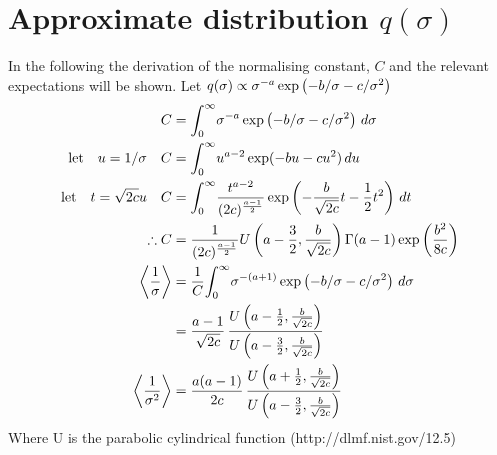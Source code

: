 \documentclass{article}
\begin{document}
\appendix
\section{Approximate distribution $q(\sigma)$}
In the following the derivation of the normalising constant, $C$ and the relevant expectations will be shown. Let $q(\sigma)\propto\sigma^{-a}\exp\left(-b/\sigma-c/\sigma^2\right)$
\begin{align}
\nonumber C&={\int_0^\infty}\sigma^{-a}\exp\left(-b/\sigma-c/\sigma^2\right)\,d\sigma\\
\nonumber \text{let}\quad u=1/\sigma\quad C &={\int_0^\infty} u^{a-2}\exp(-bu-cu^2)\,du \\
\nonumber \text{let}\quad t=\sqrt{2c}u \quad C & ={\int_0^\infty}\frac{t^{a-2}}{(2c)^{\frac{a-1}{2}}}\exp\left(-\frac{b}{\sqrt{2c}}t-\frac{1}{2}t^2\right)\,dt\\
\therefore C &=\frac{1}{(2c)^{\frac{a-1}{2}}}U\left(a-\frac{3}{2},\frac{b}{\sqrt{2c}}\right)\Gamma(a-1)\exp\left(\frac{b^2}{8c}\right)\\
\nonumber \left\langle\frac{1}{\sigma}\right\rangle&=\frac{1}{C}{\int_0^\infty}\sigma^{-(a+1)}\exp\left(-b/\sigma-c/\sigma^2\right)\,d\sigma\\
&=\frac{a-1}{\sqrt{2c}}\,\frac{U\left(a-\frac{1}{2},\frac{b}{\sqrt{2c}}\right)}{U\left(a-\frac{3}{2},\frac{b}{\sqrt{2c}}\right)}\\
\left\langle\frac{1}{\sigma^2}\right\rangle&=\frac{a(a-1)}{2c}\,\frac{U\left(a+\frac{1}{2},\frac{b}{\sqrt{2c}}\right)}{U\left(a-\frac{3}{2},\frac{b}{\sqrt{2c}}\right)}
\end{align}
Where U is the parabolic cylindrical function (http://dlmf.nist.gov/12.5)
\end{document}

